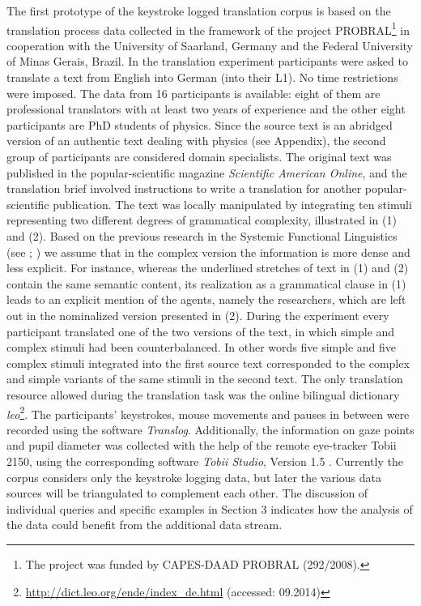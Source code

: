 \documentclass[output=paper]{LSP/langsci}
\begin{document}
The first prototype of the keystroke logged translation corpus is based on the translation process data collected in the framework of the project PROBRAL\footnote{The project was funded by CAPES-DAAD PROBRAL (292/2008).} in cooperation with the University of Saarland, Germany and the Federal University of Minas Gerais, Brazil. In the translation experiment participants were asked to translate a text from English into German (into their L1). No time restrictions were imposed. The data from 16 participants is available: eight of them are professional translators with at least two years of experience and the other eight participants are PhD students of physics. Since the source text is an abridged version of an authentic text dealing with physics (see Appendix), the second group of participants are considered domain specialists. The original text was published in the popular-scientific magazine \textit{Scientific American Online}, and the translation brief involved instructions to write a translation for another popular-scientific publication. The text was locally manipulated by integrating ten stimuli representing two different degrees of grammatical complexity, illustrated in (1) and (2). Based on the previous research in the Systemic Functional Linguistics (see \citealt[715]{Halliday2014}; \citealt[8-10]{Taverniers2003}) we assume that in the complex version the information is more dense and less explicit. For instance, whereas the underlined stretches of text in (1) and (2) contain the same semantic content, its realization as a grammatical clause in (1) leads to an explicit mention of the agents, namely the researchers, which are left out in the nominalized version presented in (2). During the experiment every participant translated one of the two versions of the text, in which simple and complex stimuli had been counterbalanced. In other words five simple and five complex stimuli integrated into the first source text corresponded to the complex and simple variants of the same stimuli in the second text. The only translation resource allowed during the translation task was the online bilingual dictionary \textit{leo}\footnote{\url{http://dict.leo.org/ende/index_de.html} (accessed: 09.2014)}. The participants’ keystrokes, mouse movements and pauses in between were recorded using the software \textit{Translog}. Additionally, the information on gaze points and pupil diameter was collected with the help of the remote eye-tracker Tobii 2150, using the corresponding software \textit{Tobii Studio}, Version 1.5 \citep{Tobii2008}. Currently the corpus considers only the keystroke logging data, but later the various data sources will be triangulated \citep[see][]{Alves2003} to complement each other. The discussion of individual queries and specific examples in Section 3 indicates how the analysis of the data could benefit from the additional data stream. 
\end{document}

